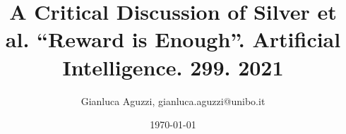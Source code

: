 \documentclass[12pt]{article}
\begin{document}
\title{A Critical Discussion of Silver et al. ``Reward is Enough''. Artificial Intelligence. 299. 2021}
\author{Gianluca Aguzzi, gianluca.aguzzi@unibo.it}
\date{\today}
\maketitle

\noindent


\renewcommand{\refname}{References}



\end{document}
